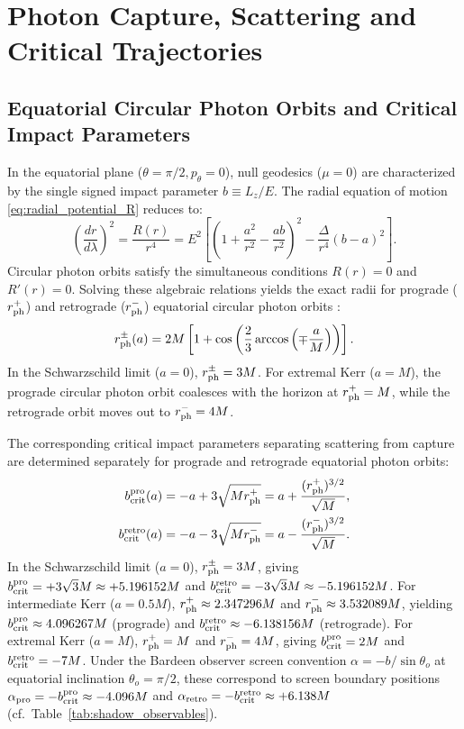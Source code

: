 \section{Photon Capture, Scattering and Critical Trajectories}
\label{sec:photon_scattering}

\subsection{Equatorial Circular Photon Orbits and Critical Impact Parameters}
In the equatorial plane ($\theta = \pi/2, p_\theta = 0$), null geodesics ($\mu = 0$) are characterized by the single signed impact parameter $b \equiv L_z/E$. The radial equation of motion \eqref{eq:radial_potential_R} reduces to:
\begin{equation}
    \left(\frac{dr}{d\lambda}\right)^2 = \frac{R(r)}{r^4} = E^2 \left[ \left(1 + \frac{a^2}{r^2} - \frac{ab}{r^2}\right)^2 - \frac{\Delta}{r^4} (b - a)^2 \right].
    \label{eq:equatorial_null_radial}
\end{equation}
Circular photon orbits satisfy the simultaneous conditions $R(r) = 0$ and $R'(r) = 0$. Solving these algebraic relations yields the exact radii for prograde ($r_{\rm ph}^+$) and retrograde ($r_{\rm ph}^-$) equatorial circular photon orbits \cite{Bardeen1973}:
\begin{equation}
    r_{\rm ph}^\pm(a) = 2M \left[ 1 + \cos\left(\frac{2}{3}\arccos\left(\mp \frac{a}{M}\right)\right) \right].
    \label{eq:kerr_photon_orbit_radii}
\end{equation}
In the Schwarzschild limit ($a = 0$), $r_{\rm ph}^\pm = 3M$. For extremal Kerr ($a = M$), the prograde circular photon orbit coalesces with the horizon at $r_{\rm ph}^+ = M$, while the retrograde orbit moves out to $r_{\rm ph}^- = 4M$.

The corresponding critical impact parameters separating scattering from capture are determined separately for prograde and retrograde equatorial photon orbits:
\begin{align}
    b_{\rm crit}^{\rm pro}(a) &= -a + 3\sqrt{M r_{\rm ph}^+} = a + \frac{(r_{\rm ph}^+)^{3/2}}{\sqrt{M}}, \label{eq:b_crit_pro} \\
    b_{\rm crit}^{\rm retro}(a) &= -a - 3\sqrt{M r_{\rm ph}^-} = a - \frac{(r_{\rm ph}^-)^{3/2}}{\sqrt{M}}. \label{eq:b_crit_retro}
\end{align}
In the Schwarzschild limit ($a = 0$), $r_{\rm ph}^\pm = 3M$, giving $b_{\rm crit}^{\rm pro} = +3\sqrt{3}M \approx +5.196152M$ and $b_{\rm crit}^{\rm retro} = -3\sqrt{3}M \approx -5.196152M$. For intermediate Kerr ($a = 0.5M$), $r_{\rm ph}^+ \approx 2.347296M$ and $r_{\rm ph}^- \approx 3.532089M$, yielding $b_{\rm crit}^{\rm pro} \approx 4.096267M$ (prograde) and $b_{\rm crit}^{\rm retro} \approx -6.138156M$ (retrograde). For extremal Kerr ($a = M$), $r_{\rm ph}^+ = M$ and $r_{\rm ph}^- = 4M$, giving $b_{\rm crit}^{\rm pro} = 2M$ and $b_{\rm crit}^{\rm retro} = -7M$. Under the Bardeen observer screen convention $\alpha = -b/\sin\theta_o$ at equatorial inclination $\theta_o = \pi/2$, these correspond to screen boundary positions $\alpha_{\rm pro} = -b_{\rm crit}^{\rm pro} \approx -4.096M$ and $\alpha_{\rm retro} = -b_{\rm crit}^{\rm retro} \approx +6.138M$ (cf.~Table~\ref{tab:shadow_observables}).

